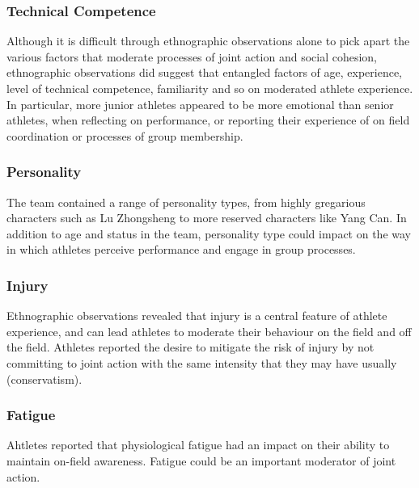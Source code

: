\begin{CJK}{UTF8}{gbsn}
        \subsubsection{Technical Competence}

Although it is difficult through ethnographic observations alone to pick apart the various factors that moderate processes of joint action and social cohesion, ethnographic observations did suggest that entangled factors of age, experience, level of technical competence, familiarity and so on moderated athlete experience.  In particular, more junior athletes appeared to be more emotional than senior athletes, when reflecting on performance, or reporting their experience of on field coordination or processes of group membership.

        \subsubsection{Personality}
The team contained a range of personality types, from highly gregarious characters such as Lu Zhongsheng to more reserved characters like Yang Can.  In addition to age and status in the team, personality type could impact on the way in which athletes perceive performance and engage in group processes.

        \subsubsection{Injury}


Ethnographic observations revealed that injury is a central feature of athlete experience, and can lead athletes to moderate their behaviour on the field and off the field.  Athletes reported the desire to mitigate the risk of injury by not committing to joint action with the same intensity that they may have usually (conservatism).


        \subsubsection{Fatigue}

Ahtletes reported that physiological fatigue had an impact on their ability to maintain on-field awareness.  Fatigue could be an important moderator of joint action.

                                                          \end{CJK}
